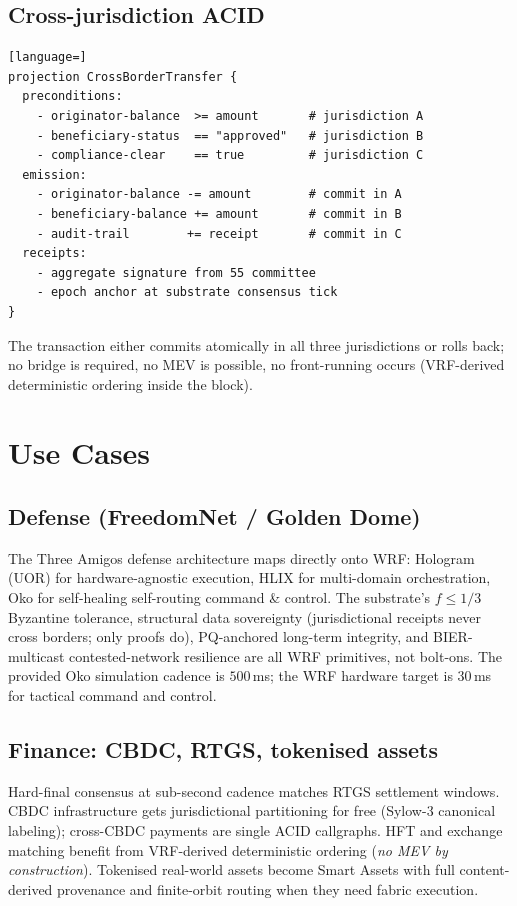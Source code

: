 \documentclass[11pt,letterpaper]{article}
\theoremstyle{remark}
\begin{document}
\subsection{Cross-jurisdiction ACID}

\begin{lstlisting}[language=]
projection CrossBorderTransfer {
  preconditions:
    - originator-balance  >= amount       # jurisdiction A
    - beneficiary-status  == "approved"   # jurisdiction B
    - compliance-clear    == true         # jurisdiction C
  emission:
    - originator-balance -= amount        # commit in A
    - beneficiary-balance += amount       # commit in B
    - audit-trail        += receipt       # commit in C
  receipts:
    - aggregate signature from 55 committee
    - epoch anchor at substrate consensus tick
}
\end{lstlisting}

The transaction either commits atomically in all three jurisdictions or rolls back; no
bridge is required, no MEV is possible, no front-running occurs (VRF-derived
deterministic ordering inside the block).

\section{Use Cases}

\subsection{Defense (FreedomNet / Golden Dome)}
The Three Amigos defense architecture maps directly onto WRF: Hologram (UOR) for
hardware-agnostic execution, HLIX for multi-domain orchestration, Oko for self-healing
self-routing command \& control. The substrate's $f \le 1/3$ Byzantine tolerance,
structural data sovereignty (jurisdictional receipts never cross borders; only proofs
do), PQ-anchored long-term integrity, and BIER-multicast contested-network resilience are
all WRF primitives, not bolt-ons. The provided Oko simulation cadence is $500$\,ms; the
WRF hardware target is $30$\,ms for tactical command and control.

\subsection{Finance: CBDC, RTGS, tokenised assets}
Hard-final consensus at sub-second cadence matches RTGS settlement windows. CBDC infrastructure
gets jurisdictional partitioning for free (Sylow-$3$ canonical labeling); cross-CBDC
payments are single ACID callgraphs. HFT and exchange matching benefit from VRF-derived
deterministic ordering (\emph{no MEV by construction}). Tokenised real-world assets
become Smart Assets with full content-derived provenance and finite-orbit routing when
they need fabric execution.
\end{document}
